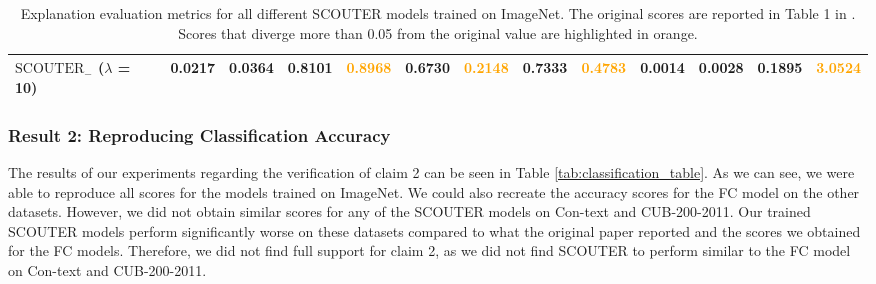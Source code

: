 \begin{table}[!ht]
{\begin{tabular}{l|cc|cc|cc|cc|cc|cc}
$\text{SCOUTER}_-$ ($\lambda$ = 10) & 0.0217        & 0.0364           & 0.8101        & \textcolor{orange}{0.8968}           & 0.6730     & \textcolor{orange}{0.2148}         & 0.7333     & \textcolor{orange}{0.4783}         & 0.0014        & 0.0028            & 0.1895         & \textcolor{orange}{3.0524}           \\ \hline
\end{tabular}}
\vspace{3mm}
\caption{Explanation evaluation metrics for all different SCOUTER models trained on ImageNet. The original scores are reported in Table 1 in \cite{scouter}. Scores that diverge more than 0.05 from the original value are highlighted in orange.}
\label{tab:exp_eval}
\end{table}

\subsubsection{Result 2: Reproducing Classification Accuracy}
The results of our experiments regarding the verification of claim 2 can be seen in Table \ref{tab:classification_table}. As we can see, we were able to reproduce all scores for the models trained on ImageNet. We could also recreate the accuracy scores for the FC model on the other datasets. However, we did not obtain similar scores for any of the SCOUTER models on Con-text and CUB-200-2011. Our trained SCOUTER models perform significantly worse on these datasets compared to what the original paper reported and the scores we obtained for the FC models. Therefore, we did not find full support for claim 2, as we did not find SCOUTER to perform similar to the FC model on Con-text and CUB-200-2011. 
